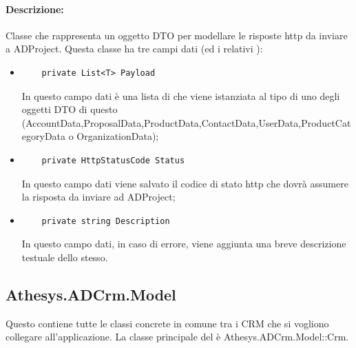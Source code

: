 \paragraph{Descrizione:}
Classe che rappresenta un oggetto \gls{DTO} per modellare le risposte \gls{http} da inviare a ADProject.
Questa classe ha tre campi dati (ed i relativi ):
\begin{itemize}
	\item 	
	\begin{lstlisting}
	private List<T> Payload
	\end{lstlisting}
	In questo campo dati è una lista di  che viene istanziata al tipo di uno degli oggetti \gls{DTO} di questo  (AccountData,ProposalData,ProductData,ContactData,UserData,ProductCategoryData o OrganizationData);
	
	\item 	
	\begin{lstlisting}
	private HttpStatusCode Status
	\end{lstlisting}
	In questo campo dati viene salvato il codice di stato \gls{http} che dovrà assumere la risposta da inviare ad ADProject;
	
	\item
	\begin{lstlisting}
	private string Description
	\end{lstlisting}
	In questo campo dati, in caso di errore, viene aggiunta una breve descrizione testuale dello stesso.
\end{itemize}




\subsection{Athesys.ADCrm.Model}
Questo  contiene tutte le classi concrete in comune tra i \gls{CRM} che si vogliono collegare all'applicazione.
La classe principale del  è Athesys.ADCrm.Model::Crm.
